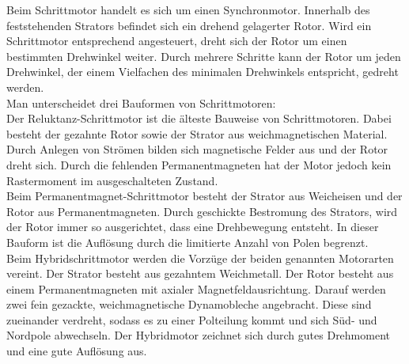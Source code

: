 Beim Schrittmotor handelt es sich um einen Synchronmotor. Innerhalb des feststehenden Strators befindet sich ein drehend gelagerter Rotor. Wird ein Schrittmotor entsprechend angesteuert, dreht sich der Rotor um einen bestimmten Drehwinkel weiter. Durch mehrere Schritte kann der Rotor um jeden Drehwinkel, der einem Vielfachen des minimalen Drehwinkels entspricht, gedreht werden. \\
Man unterscheidet drei Bauformen von Schrittmotoren: \\
Der Reluktanz-Schrittmotor ist die älteste Bauweise von Schrittmotoren. Dabei besteht der gezahnte Rotor sowie der Strator aus weichmagnetischen Material. Durch Anlegen von Strömen bilden sich magnetische Felder aus und der Rotor dreht sich. Durch die fehlenden Permanentmagneten hat der Motor jedoch kein Rastermoment im ausgeschalteten Zustand.\\
Beim Permanentmagnet-Schrittmotor besteht der Strator aus Weicheisen und der Rotor aus Permanentmagneten. Durch geschickte Bestromung des Strators, wird der Rotor immer so ausgerichtet, dass eine Drehbewegung entsteht. In dieser Bauform ist die Auflösung durch die limitierte Anzahl von Polen begrenzt.\\
Beim Hybridschrittmotor werden die Vorzüge der beiden genannten Motorarten vereint. Der Strator besteht aus gezahntem Weichmetall. Der Rotor besteht aus einem Permanentmagneten mit axialer Magnetfeldausrichtung. Darauf werden zwei fein gezackte, weichmagnetische Dynamobleche angebracht. Diese sind zueinander verdreht, sodass es zu einer Polteilung kommt und sich Süd- und Nordpole abwechseln. Der Hybridmotor zeichnet sich durch gutes Drehmoment und eine gute Auflösung aus.


